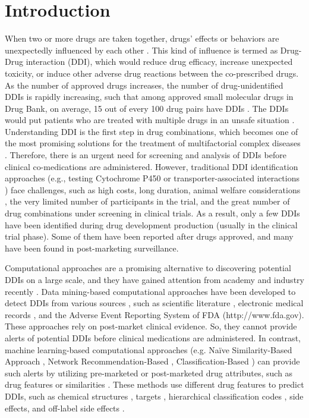 \documentclass{bmcart}
\begin{document}
\section*{Introduction}
When two or more drugs are taken together, drugs' effects or behaviors are unexpectedly influenced by each other
\cite{wienkers2005predicting}. 
This kind of influence is termed as Drug-Drug interaction (DDI), which would reduce drug efficacy, increase unexpected toxicity, or induce other adverse drug reactions between the co-prescribed drugs. As the number of approved drugs increases, the number of drug-unidentified DDIs is rapidly increasing, such that among approved small molecular drugs in Drug Bank, on average, 15 out of every 100  drug pairs have DDIs
\cite{law2014drugbank}. 
The DDIs would put patients who are treated with multiple drugs in an unsafe situation
\cite{leape1995systems, businaro2013we, karbownik2017pharmacokinetic, mulroy2017giant}.
Understanding DDI is the first step in drug combinations, which becomes one of the most promising solutions for the treatment of multifactorial complex diseases
\cite{zhao2011prediction}.
Therefore, there is an urgent need for screening and analysis of DDIs before clinical co-medications are administered. However, traditional DDI identification approaches (e.g., testing Cytochrome P450
\cite{veith2009comprehensive}
 or transporter-associated interactions
\cite{huang2007drug})
face challenges, such as high costs, long duration, animal welfare considerations
\cite {zhang2015label},
the very limited number of participants in the trial, and the great number of drug combinations under screening in clinical trials. As a result, only a few DDIs have been identified during drug development production (usually in the clinical trial phase). Some of them have been reported after drugs approved, and many have been found in post-marketing surveillance.

Computational approaches are a promising alternative to discovering potential DDIs on a large scale, and they have gained attention from academy and industry recently
\cite{wisniowska2016role, zhou2016simulation}.
Data mining-based computational approaches have been developed to detect DDIs from various sources
\cite{zhang2015label}
, such as scientific literature
\cite{bui2014novel, zhang2016leveraging}
, electronic medical records
\cite{yamanishi2008prediction}
, and the Adverse Event Reporting System of FDA (http://www.fda.gov). These approaches rely on post-market clinical evidence. So, they cannot provide alerts of potential DDIs before clinical medications are administered. In contrast, machine learning-based computational approaches (e.g. Naïve Similarity-Based Approach
\cite{vilar2014similarity}
, Network Recommendation-Based
\cite{zhang2015label}
, Classification-Based
\cite{cheng2014machine}
) can provide such alerts by utilizing pre-marketed or post-marketed drug attributes, such as drug features or similarities
\cite{pahikkala2015toward}.
These methods use different drug features to predict DDIs, such as chemical structures
\cite{vilar2014similarity}
, targets
\cite{luo2014ddi}
, hierarchical classification codes
\cite{cheng2014machine}
, side effects, and off-label side effects
\cite{zhang2015label, shi2017predicting}.
\end{document}
